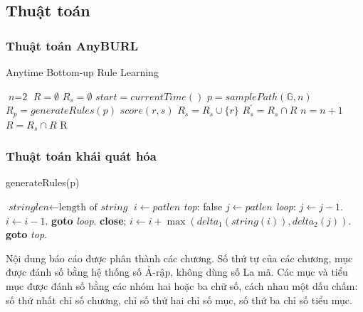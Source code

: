 \subsection{Thuật toán}
\subsubsection{Thuật toán AnyBURL}
\begin{algorithm}
\caption{Anytime Bottom-up Rule Learning}\label{euclid}
\begin{algorithmic}[1]
\State $\textit{n} = \text{2}$
\State $R = \emptyset$
\Loop
\State $R_s = \emptyset$
\State $start = currentTime()$
\Repeat
\State $p = samplePath(\mathbb{G}, n)$
\State $R_p = generateRules(p)$
\State $score(r, s)$
	\State $R_s = R_s \cup \{r\}$
\EndIf
\EndFor
{}
\State $R^{\prime}_s = R_s \cap R$
	\State $n = n + 1$
\EndIf
\State $R = R_s \cap R$
\EndLoop
\Return R
\EndProcedure
\end{algorithmic}
\end{algorithm}


\subsubsection{Thuật toán khái quát hóa}
\begin{algorithm}
\caption{generateRules(p)}\label{euclid}
\begin{algorithmic}[1]
\State $\textit{stringlen} \gets \text{length of }\textit{string}$
\State $i \gets \textit{patlen}$
\BState \emph{top}:
 \Return false
\EndIf
\State $j \gets \textit{patlen}$
\BState \emph{loop}:
\State $j \gets j-1$.
\State $i \gets i-1$.
\State \textbf{goto} \emph{loop}.
\State \textbf{close};
\EndIf
\State $i \gets i+\max(\textit{delta}_1(\textit{string}(i)),\textit{delta}_2(j))$.
\State \textbf{goto} \emph{top}.
\EndProcedure
\end{algorithmic}
\end{algorithm}

Nội dung báo cáo được phân thành các chương. Số thứ tự của các chương, mục được đánh số bằng hệ thống số Ả-rập, không dùng số La mã. Các mục và tiểu mục được đánh số bằng các nhóm hai hoặc ba chữ số, cách nhau một dấu chấm: số thứ nhất chỉ số chương, chỉ số thứ hai chỉ số mục, số thứ ba chỉ số tiểu mục.

